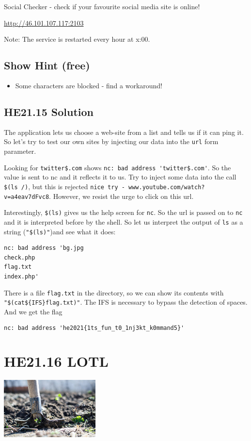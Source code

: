 \documentclass[english,a4paper,nols,noindent]{tufte-handout}
\begin{document}
\noindent Social Checker - check if your favourite social media site is online!

\url{http://46.101.107.117:2103}

Note: The service is restarted every hour at x:00.

\subsection{Show Hint (free)}
\begin{itemize}
\item Some characters are blocked - find a workaround!
\end{itemize}


\hypertarget{he21.15-solution}{%
\subsection{HE21.15 Solution}\label{he21.15-solution}}

\noindent The application lets us choose a web-site from a list and tells us if
it can ping it.  So let's try to test our own sites by injecting our data into
the \verb+url+ form parameter.

Looking for \verb+twitter$.com+ shows \verb+nc: bad address 'twitter$.com'+.
So the value is sent to nc and it reflects it to us.  Try to inject some data
into the call \verb+$(ls /)+, but this is rejected 
\verb+nice try - www.youtube.com/watch?v=a4eav7dFvc8+. However, we
resist the urge to click on this url.

Interestingly, \verb+$(ls)+ gives us the help screen for \verb+nc+.  So the url
is passed on to \verb+nc+ and it is interpreted before by the shell.  So let us
interpret the output of \verb+ls+ as a string (\verb+"$(ls)"+)and see what it
does:
\begin{verbatim}
nc: bad address 'bg.jpg
check.php
flag.txt
index.php'
\end{verbatim}

There is a file \verb+flag.txt+ in the directory, so we can show its contents
with \verb+"$(cat${IFS}flag.txt)"+.  The IFS is necessary to bypass the
detection of spaces.  And we get the flag

\begin{verbatim}
nc: bad address 'he2021{1ts_fun_t0_1nj3kt_k0mmand5}'
\end{verbatim}

\hypertarget{he21.16}{%
  \section{HE21.16 LOTL}
  \label{he21.16}}
\begin{marginfigure}
    \includegraphics[width=50mm]{images/challenge16.jpg}
\end{marginfigure}
\end{document}
